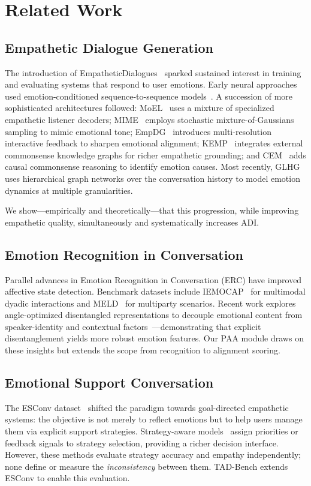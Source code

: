 \documentclass[lettersize,journal]{IEEEtran}
\begin{document}
\section{Related Work}
\label{sec:related}

\subsection{Empathetic Dialogue Generation}
The introduction of EmpatheticDialogues~\cite{rashkin2019empathetic} sparked
sustained interest in training and evaluating systems that respond to user
emotions.  Early neural approaches used emotion-conditioned
sequence-to-sequence models~\cite{zhou2018ecm}.  A succession of more
sophisticated architectures followed: MoEL~\cite{kim2021moel} uses a mixture
of specialized empathetic listener decoders; MIME~\cite{majumder2020mime}
employs stochastic mixture-of-Gaussians sampling to mimic emotional tone;
EmpDG~\cite{li2020empdg} introduces multi-resolution interactive feedback to
sharpen emotional alignment; KEMP~\cite{li2022kemp} integrates external
commonsense knowledge graphs for richer empathetic grounding; and
CEM~\cite{sabour2022cem} adds causal commonsense reasoning to identify
emotion causes.  Most recently, GLHG~\cite{ma2023glhg} uses hierarchical
graph networks over the conversation history to model emotion dynamics at
multiple granularities.

We show—empirically and theoretically—that this progression, while improving
empathetic quality, simultaneously and systematically increases ADI.

\subsection{Emotion Recognition in Conversation}
Parallel advances in Emotion Recognition in Conversation (ERC) have improved
affective state detection.  Benchmark datasets include
IEMOCAP~\cite{busso2008iemocap} for multimodal dyadic interactions and
MELD~\cite{poria2019meld} for multiparty scenarios.  Recent work explores
angle-optimized disentangled representations to decouple emotional content
from speaker-identity and contextual
factors~\cite{kim2023angle}—demonstrating that explicit disentanglement
yields more robust emotion features.  Our PAA module draws on these insights
but extends the scope from recognition to alignment scoring.

\subsection{Emotional Support Conversation}
The ESConv dataset~\cite{liu2021esc} shifted the paradigm towards
goal-directed empathetic systems: the objective is not merely to reflect
emotions but to help users manage them via explicit support strategies.
Strategy-aware models~\cite{wu2022priority,cheng2022fado} assign priorities
or feedback signals to strategy selection, providing a richer decision
interface.  However, these methods evaluate strategy accuracy and empathy
independently; none define or measure the \emph{inconsistency} between them.
TAD-Bench extends ESConv to enable this evaluation.
\end{document}
